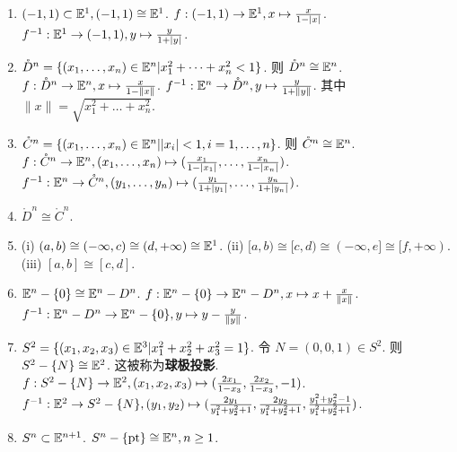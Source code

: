 \begin{instance}
    \begin{enumerate}
        \item $(-1,1)\subset \mathbb{E}^1, (-1,1)\cong \mathbb{E}^1$.
        $f:(-1,1)\to\mathbb{E}^1, x\mapsto \frac{x}{1-|x|}$.
        $f^{-1}:\mathbb{E}^1\to(-1,1), y\mapsto \frac{y}{1+|y|}$.

        \item $\mathring{D}^n = \{(x_1,\dots,x_n)\in\mathbb{E}^n | x_1^2+\dots+x_n^2 < 1\}$. 则 $\mathring{D}^n \cong \mathbb{E}^n$.
        $f:\mathring{D}^n\to\mathbb{E}^n, x\mapsto \frac{x}{1-\|x\|}$.
        $f^{-1}:\mathbb{E}^n\to\mathring{D}^n, y\mapsto \frac{y}{1+\|y\|}$.
        其中 $\|x\|=\sqrt{x_1^2+\dots+x_n^2}$.

        \item $\mathring{C}^n = \{(x_1,\dots,x_n)\in\mathbb{E}^n | |x_i|<1, i=1,\dots,n\}$. 则 $\mathring{C}^n \cong \mathbb{E}^n$.
        $f:\mathring{C}^n\to\mathbb{E}^n, (x_1,\dots,x_n)\mapsto (\frac{x_1}{1-|x_1|},\dots,\frac{x_n}{1-|x_n|})$.
        $f^{-1}:\mathbb{E}^n\to\mathring{C}^n, (y_1,\dots,y_n)\mapsto (\frac{y_1}{1+|y_1|},\dots,\frac{y_n}{1+|y_n|})$.

        \item $\mathring{D}^n \cong \mathring{C}^n$.

        \item (i) $(a,b)\cong(-\infty,c)\cong(d,+\infty)\cong\mathbb{E}^1$.
        (ii) $[a,b)\cong[c,d)\cong(-\infty,e]\cong[f,+\infty)$.
        (iii) $[a,b]\cong[c,d]$.

        \item $\mathbb{E}^n-\{0\} \cong \mathbb{E}^n-D^n$.
        $f:\mathbb{E}^n-\{0\}\to\mathbb{E}^n-D^n, x\mapsto x+\frac{x}{\|x\|}$.
        $f^{-1}:\mathbb{E}^n-D^n\to\mathbb{E}^n-\{0\}, y\mapsto y-\frac{y}{\|y\|}$.

        \item $S^2=\{(x_1,x_2,x_3)\in\mathbb{E}^3 | x_1^2+x_2^2+x_3^2=1\}$.
        令 $N=(0,0,1)\in S^2$. 则 $S^2-\{N\}\cong\mathbb{E}^2$. 这被称为\textbf{球极投影}.
        $f:S^2-\{N\}\to\mathbb{E}^2, (x_1,x_2,x_3)\mapsto(\frac{2x_1}{1-x_3},\frac{2x_2}{1-x_3},-1)$.
        $f^{-1}:\mathbb{E}^2\to S^2-\{N\}, (y_1,y_2)\mapsto(\frac{2y_1}{y_1^2+y_2^2+1},\frac{2y_2}{y_1^2+y_2^2+1},\frac{y_1^2+y_2^2-1}{y_1^2+y_2^2+1})$.

        \item $S^n\subset\mathbb{E}^{n+1}$. $S^n-\{\text{pt}\}\cong\mathbb{E}^n, n\ge 1$.
    \end{enumerate}
\end{instance}

